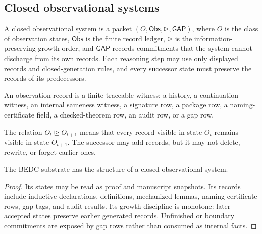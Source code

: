 \subsection{Closed observational systems}
\label{subsec:philosophy-closed-observational-systems}

\begin{definition}
\label{def:philosophy-closed-observational-system}
A closed observational system is a packet
\((O,\mathsf{Obs},\unrhd,\mathsf{GAP})\), where \(O\) is the class of
observation states, \(\mathsf{Obs}\) is the finite record ledger,
\(\unrhd\) is the information-preserving growth order, and
\(\mathsf{GAP}\) records commitments that the system cannot discharge
from its own records. Each reasoning step may use only displayed
records and closed-generation rules, and every successor state must
preserve the records of its predecessors.
\end{definition}

\begin{definition}
\label{def:philosophy-observation-record}
An observation record is a finite traceable witness: a history, a
continuation witness, an internal sameness witness, a signature row, a
package row, a naming-certificate field, a checked-theorem row, an
audit row, or a gap row.
\end{definition}

\begin{definition}
\label{def:philosophy-information-preservation}
The relation \(O_t\unrhd O_{t+1}\) means that every record visible in
state \(O_t\) remains visible in state \(O_{t+1}\). The successor may
add records, but it may not delete, rewrite, or forget earlier ones.
\end{definition}

\begin{theorem}
\label{thm:philosophy-bedc-closed-observational-system}
The BEDC substrate has the structure of a closed observational system.
\end{theorem}
\begin{proof}
Its states may be read as proof and manuscript snapshots. Its records
include inductive declarations, definitions, mechanized lemmas, naming
certificate rows, gap tags, and audit results. Its growth discipline is
monotone: later accepted states preserve earlier generated records.
Unfinished or boundary commitments are exposed by gap rows rather than
consumed as internal facts.
\end{proof}

